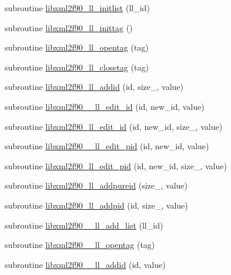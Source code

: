 \begin{DoxyCompactItemize}
\item 
subroutine \hyperlink{libxml2f90_8f90__pp_8f90_abd1f7aafd23265c8c8ed7934fff5af75}{libxml2f90\+\_\+ll\+\_\+initlist} (ll\+\_\+id)
\item 
subroutine \hyperlink{libxml2f90_8f90__pp_8f90_a9ffe2ce74c95d1e444dd17c02cf7ca19}{libxml2f90\+\_\+ll\+\_\+inittag} ()
\item 
subroutine \hyperlink{libxml2f90_8f90__pp_8f90_a102819b1160e7cccf698c60979acaef5}{libxml2f90\+\_\+ll\+\_\+opentag} (tag)
\item 
subroutine \hyperlink{libxml2f90_8f90__pp_8f90_a23bfc785d957e044414ea18be75ac87a}{libxml2f90\+\_\+ll\+\_\+closetag} (tag)
\item 
subroutine \hyperlink{libxml2f90_8f90__pp_8f90_aedf302b29e22ba3b7312a7650ac0134b}{libxml2f90\+\_\+ll\+\_\+addid} (id, size\+\_\+, value)
\item 
subroutine \hyperlink{libxml2f90_8f90__pp_8f90_a3c214cdd6b674131bd309980b862b11d}{libxml2f90\+\_\+\+\_\+ll\+\_\+edit\+\_\+id} (id, new\+\_\+id, value)
\item 
subroutine \hyperlink{libxml2f90_8f90__pp_8f90_a69526b5264bc6d6f141bc8a9b0c7cc77}{libxml2f90\+\_\+ll\+\_\+edit\+\_\+id} (id, new\+\_\+id, size\+\_\+, value)
\item 
subroutine \hyperlink{libxml2f90_8f90__pp_8f90_a7170975a9d7aeb275e0c6b9c7c809ead}{libxml2f90\+\_\+\+\_\+ll\+\_\+edit\+\_\+pid} (id, new\+\_\+id, value)
\item 
subroutine \hyperlink{libxml2f90_8f90__pp_8f90_aa49d7ebdfc709eed8ffaaae8f0b58d9b}{libxml2f90\+\_\+ll\+\_\+edit\+\_\+pid} (id, new\+\_\+id, size\+\_\+, value)
\item 
subroutine \hyperlink{libxml2f90_8f90__pp_8f90_a339be1907542e3618239cb185bd5c386}{libxml2f90\+\_\+ll\+\_\+addpureid} (size\+\_\+, value)
\item 
subroutine \hyperlink{libxml2f90_8f90__pp_8f90_a844ec38349c1e4d4537237258b453eda}{libxml2f90\+\_\+ll\+\_\+addpid} (id, size\+\_\+, value)
\item 
subroutine \hyperlink{libxml2f90_8f90__pp_8f90_a9f50298bda8735c41959e4e4275d97bd}{libxml2f90\+\_\+\+\_\+ll\+\_\+add\+\_\+list} (ll\+\_\+id)
\item 
subroutine \hyperlink{libxml2f90_8f90__pp_8f90_a113f047d3ac5fe6e1573d1c123afbd87}{libxml2f90\+\_\+\+\_\+ll\+\_\+opentag} (tag)
\item 
subroutine \hyperlink{libxml2f90_8f90__pp_8f90_ab78ccc23aca850d7f57e4cbb417fa8a3}{libxml2f90\+\_\+\+\_\+ll\+\_\+addid} (id, value)
\item 

\end{DoxyCompactItemize}
